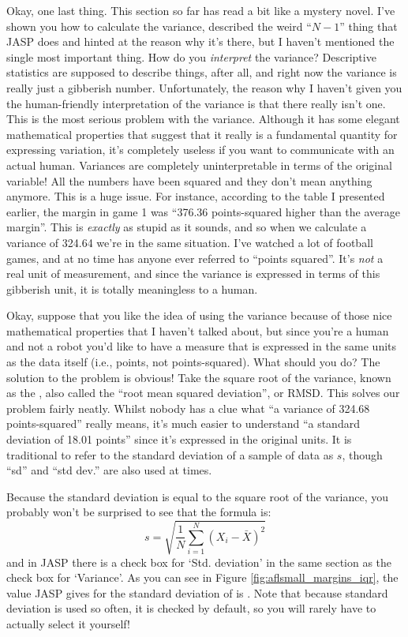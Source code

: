 Okay, one last thing. This section so far has read a bit like a mystery novel. I've shown you how to calculate the variance, described the weird ``$N-1$'' thing that JASP does and hinted at the reason why it's there, but I haven't mentioned the single most important thing. How do you {\it interpret} the variance? Descriptive statistics are supposed to describe things, after all, and right now the variance is really just a gibberish number. Unfortunately, the reason why I haven't given you the human-friendly interpretation of the variance is that there really isn't one. This is the most serious problem with the variance. Although it has some elegant mathematical properties that suggest that it really is a fundamental quantity for expressing variation, it's completely useless if you want to communicate with an actual human. Variances are completely uninterpretable in terms of the original variable! All the numbers have been squared and they don't mean anything anymore. This is a huge issue. For instance, according to the table I presented earlier, the margin in game 1 was ``376.36 points-squared higher than the average margin''. This is {\it exactly} as stupid as it sounds, and so when we calculate a variance of 324.64 we're in the same situation. I've watched a lot of football games, and at no time has anyone ever referred to ``points squared''. It's {\it not} a real unit of measurement, and since the variance is expressed in terms of this gibberish unit, it is totally meaningless to a human.


Okay, suppose that you like the idea of using the variance because of those nice mathematical properties that I haven't talked about, but since you're a human and not a robot you'd like to have a measure that is expressed in the same units as the data itself (i.e., points, not points-squared). What should you do? The solution to the problem is obvious! Take the square root of the variance, known as the , also called the ``root mean squared deviation'', or RMSD. This solves our problem fairly neatly. Whilst nobody has a clue what ``a variance of 324.68 points-squared'' really means, it's much easier to understand ``a standard deviation of 18.01 points'' since it's expressed in the original units. It is traditional to refer to the standard deviation of a sample of data as $s$, though ``sd'' and ``std dev.'' are also used at times. 

\vspace{0.5cm}
\begin{mdframed}[style=MyFrame,nobreak=true]
Because the standard deviation is equal to the square root of the variance, you probably won't be surprised to see that the formula is:
$$
s = \sqrt{ \frac{1}{N} \sum_{i=1}^N \left( X_i - \bar{X} \right)^2 }
$$
and in JASP there is a check box for `Std. deviation' in the same section as the check box for `Variance'. As you can see in Figure \ref{fig:aflsmall_margins_iqr}, the value JASP gives for the standard deviation of  is .  Note that because standard deviation is used so often, it is checked by default, so you will rarely have to actually select it yourself!
\end{mdframed}

